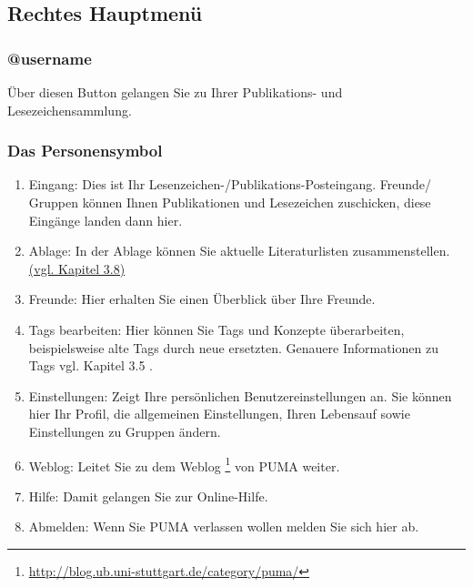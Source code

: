 \subsection{Rechtes Hauptmenü}
\subsubsection{@username}
Über diesen Button gelangen Sie zu Ihrer Publikations- und Lesezeichensammlung. 
\subsubsection{Das Personensymbol}
\begin{enumerate}
    \item Eingang: Dies ist Ihr Lesenzeichen-/Publikations-Posteingang. Freunde/ Gruppen können Ihnen Publikationen und Lesezeichen zuschicken, diese Eingänge landen dann hier.
    \item Ablage: In der Ablage können Sie aktuelle Literaturlisten zusammenstellen. \hyperlink{Ablage}{(vgl. Kapitel 3.8)}
    \item Freunde: Hier erhalten Sie einen Überblick über Ihre Freunde. 
    \item Tags bearbeiten: Hier können Sie Tags und Konzepte überarbeiten, beispielsweise alte Tags durch neue ersetzten. Genauere Informationen zu Tags vgl. Kapitel 3.5 .
    \item Einstellungen: Zeigt Ihre persönlichen Benutzereinstellungen an. Sie können hier Ihr Profil, die allgemeinen Einstellungen, Ihren Lebensauf sowie Einstellungen zu Gruppen ändern.
    \item Weblog: Leitet Sie zu dem Weblog \footnote{\url{http://blog.ub.uni-stuttgart.de/category/puma/}} von PUMA weiter.
    \item Hilfe: Damit gelangen Sie zur Online-Hilfe.
    \item Abmelden: Wenn Sie PUMA verlassen wollen melden Sie sich hier ab. 
\end{enumerate}


